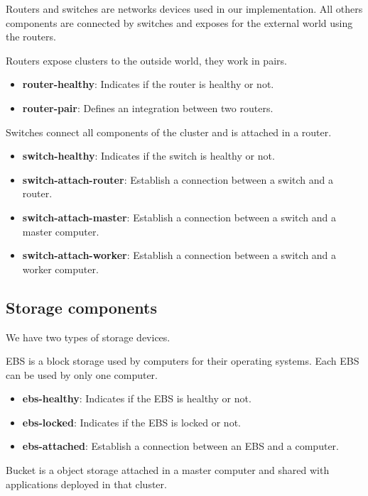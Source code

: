 \documentclass[letterpaper]{article}
\begin{document}
Routers and switches are networks devices used in our implementation. All others components are connected by switches and exposes for the external world using the routers.

Routers expose clusters to the outside world, they work in pairs.

\begin{itemize}
    \item \textbf{router-healthy}: Indicates if the router is healthy or not.
    \item \textbf{router-pair}: Defines an integration between two routers.
\end{itemize}

Switches connect all components of the cluster and is attached in a router.

\begin{itemize}
    \item \textbf{switch-healthy}: Indicates if the switch is healthy or not.
    \item \textbf{switch-attach-router}: Establish a connection between a switch and a router.
    \item \textbf{switch-attach-master}: Establish a connection between a switch and a master computer.
    \item \textbf{switch-attach-worker}: Establish a connection between a switch and a worker computer.
\end{itemize}

\subsection{Storage components}\label{sec:implementation3}

We have two types of storage devices.

EBS is a block storage used by computers for their operating systems. Each EBS can be used by only one computer.

\begin{itemize}
    \item \textbf{ebs-healthy}: Indicates if the EBS is healthy or not.
    \item \textbf{ebs-locked}: Indicates if the EBS is locked or not.
    \item \textbf{ebs-attached}: Establish a connection between an EBS and a computer.
\end{itemize}

Bucket is a object storage attached in a master computer and shared with applications deployed in that cluster.
\end{document}
